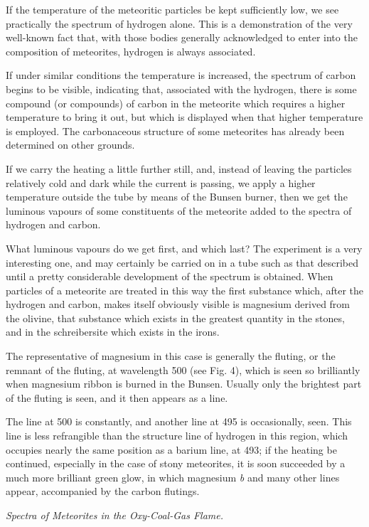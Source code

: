 \documentclass[a4paper, 12pt, oneside, polutonikogreek, english]{article}
\begin{document}
If the temperature of the meteoritic particles be kept sufficiently low, we see practically the spectrum of hydrogen alone. This is a demonstration of the very well-known fact that, with those bodies generally acknowledged to enter into the composition of meteorites, hydrogen is always associated.

If under similar conditions the temperature is increased, the spectrum of carbon begins to be visible, indicating that, associated with the hydrogen, there is some compound (or compounds) of carbon in the meteorite which requires a higher temperature to bring it out, but which is displayed when that higher temperature is employed. The carbonaceous structure of some meteorites has already been determined on other grounds.

If we carry the heating a little further still, and, instead of leaving the particles relatively cold and dark while the current is passing, we apply a higher temperature outside the tube by means of the Bunsen burner, then we get the luminous vapours of some constituents of the meteorite added to the spectra of hydrogen and carbon.

What luminous vapours do we get first, and which last? The experiment is a very interesting one, and may certainly be carried on in a tube such as that described until a pretty considerable development of the spectrum is obtained. When particles of a meteorite are treated in this way the first substance which, after the hydrogen and carbon, makes itself obviously visible is magnesium derived from the olivine, that substance which exists in the greatest quantity in the stones, and in the schreibersite which exists in the irons.

The representative of magnesium in this case is generally the fluting, or the remnant of the fluting, at wavelength 500 (see Fig. 4), which is seen so brilliantly when magnesium ribbon is burned in the Bunsen. Usually only the brightest part of the fluting is seen, and it then appears as a line.

The line at 500 is constantly, and another line at 495 is occasionally, seen. This line is less refrangible than the structure line of hydrogen in this region, which occupies nearly the same position as a barium line, at 493; if the heating be continued, especially in the case of stony meteorites, it is soon succeeded by a much more brilliant green glow, in which magnesium \emph{b} and many other lines appear, accompanied by the carbon flutings.
\begin{center}
\emph{Spectra of Meteorites in the Oxy-Coal-Gas Flame.}
\end{center}
\end{document}

